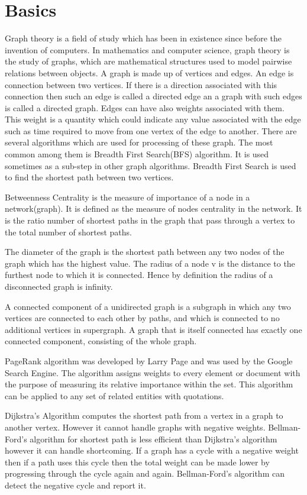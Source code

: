 \documentclass[a4paper,10pt,twoside]{article}
\begin{document}
\section{Basics}

Graph theory is a field of study which has been in existence since before the invention of computers. In mathematics and computer science, graph theory is the study of graphs, which are mathematical structures used to model pairwise relations between objects\cite{wiki:GraphTheory}. A graph is made up of vertices and edges. An edge is connection between two vertices. If there is a direction associated with this connection then such an edge is called a directed edge an a graph with such edges is called a directed graph. Edges can have also weights associated with them. This weight is a quantity which could indicate any value associated with the edge such as time required to move from one vertex of the edge to another. 
	There are several algorithms which are used for processing of these graph. The most common among them is Breadth First Search(BFS) algorithm. It is used sometimes as a sub-step in other graph algorithms. Breadth First Search is used to find the shortest path between two vertices. 

	Betweenness Centrality is the measure of importance of a node in a network(graph). It is defined as the measure of nodes centrality in the network. It is the  ratio number of shortest paths in the graph that pass through a vertex to the total number of shortest paths.

	The diameter of the graph is the shortest path between any two nodes of the graph which has the highest value. The radius of a node v is the distance to the furthest node to which it is connected. Hence by definition the radius of a disconnected graph is infinity.

	A connected component of a unidirected graph is a subgraph in which any two vertices are connected to each other by paths, and which is connected to no additional vertices in supergraph. A graph that is itself connected has exactly one connected component, consisting of the whole graph.

	PageRank algorithm \cite{Brin:1998:ALH:297810.297827} was developed by Larry Page and was used by the Google Search Engine. The algorithm assigns weights to every element or document with the purpose of measuring its relative importance within the set. This algorithm can be applied to any set of related entities with quotations.

	Dijkstra's Algorithm computes the shortest path from a vertex in a graph to another vertex. However it cannot handle graphs with negative weights. Bellman-Ford's algorithm for shortest path is less efficient than Dijkstra's algorithm however it can handle shortcoming. If a graph has a cycle with a negative weight then if a path uses this cycle then the total weight can be made lower by progressing through the cycle again and again. Bellman-Ford's algorithm can detect the negative cycle and report it.
\end{document}
